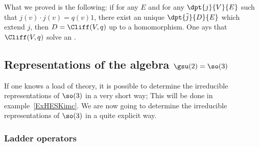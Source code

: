 What we proved is the following: if for any $E$ and for any $\dpt{j}{V}{E}$ such that $j(v)\cdot j(v)=q(v)1$, there exist an unique $\dpt{\tilde{j}}{D}{E}$ which extend $j$, then $D=\Cliff(V,q)$ up to a homomorphism. One ays that $\Cliff(V,q)$ solve an .

\subsection{Representations of the algebra \texorpdfstring{$\gsu(2)=\so(3)$}{su2so3}}
\label{subsecPJmtqrG}

If one knows a load of theory, it is possible to determine the irreducible representations of \( \so(3)\) in a very short way; This will be done in example~\ref{ExHESKimc}. We are now going to determine the irreducible representations of \( \so(3)\) in a quite explicit way.

\subsubsection{Ladder operators}

